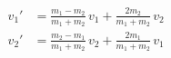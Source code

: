 \documentclass[preview,border=2pt]{standalone}
\begin{document}
$\begin{aligned}
v_1' &= \frac{m_1-m_2}{m_1+m_2}\,v_1 + \frac{2m_2}{m_1+m_2}\,v_2 \\[2pt]
v_2' &= \frac{m_2-m_1}{m_1+m_2}\,v_2 + \frac{2m_1}{m_1+m_2}\,v_1
\end{aligned}$
\end{document}
